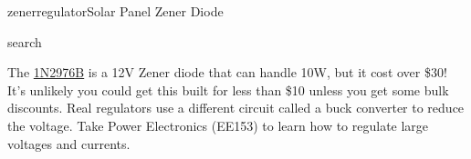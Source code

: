 \begin{mainquestion}{zenerregulator}{Solar Panel Zener Diode}
\begin{partquestion}{search}
\begin{answer}
The \href{https://www.mouser.com/datasheet/3/282/1/1N2970B-3015B.1N3993A-3998A.pdf}{1N2976B} is a 12V Zener diode that can handle 10W, but it cost over \$30! It's unlikely you could get this built for less than \$10 unless you get some bulk discounts. Real regulators use a different circuit called a buck converter to reduce the voltage. Take Power Electronics (EE153) to learn how to regulate large voltages and currents.
\end{answer}
\end{partquestion}


\end{mainquestion}

